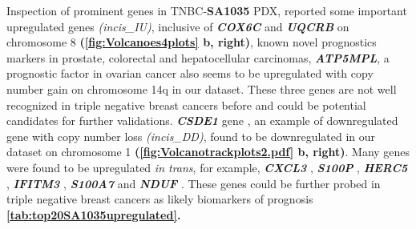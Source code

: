  Inspection of prominent genes in TNBC-\textbf{SA1035} PDX, reported some important upregulated genes \textit{(incis\_IU)}, inclusive of \textit{\textbf{COX6C}} \cite{yang2018overexpression,chang2017estrogen} and 
 \textit{\textbf{UQCRB}} \cite{kim2017mitochondrial,park2017mitochondrial} on chromosome 8 \textbf{(\autoref{fig:Volcanoes4plots} b, right)}, known novel prognostics markers in prostate, colorectal and hepatocellular carcinomas, \textit{\textbf{ATP5MPL}}, a prognostic factor in ovarian cancer also seems to be upregulated with copy number gain on chromosome 14q in our dataset. These three genes are not well recognized in triple negative breast cancers before and could be potential candidates for further validations. \textit{\textbf{CSDE1} } gene \cite{martinez2019unr}, an example of downregulated gene with copy number loss \textit{(incis\_DD)}, found to be downregulated in our dataset on chromosome 1 \textbf{(\autoref{fig:Volcanotrackplots2.pdf} b, right)}. Many genes were found to be upregulated \textit{in trans}, for example, \textit{\textbf{CXCL3} }\cite{gui2016overexpression, karin2020cxcr3}, \textit{\textbf{S100P}} \cite{arumugam2011s100p,cong2020calcium}, 
\textit{\textbf{HERC5}} \cite{wrage2015identification}, 
\textit{\textbf{IFITM3}} \cite{liu2019ifitm3}, \textit{\textbf{S100A7}} 
\cite{zhang2019clinical, mayama2018olfm} and \textit{\textbf{NDUF}} 
\cite{li2015down}. These genes could be further probed in triple negative breast cancers as likely biomarkers of prognosis \textbf{\autoref{tab:top20SA1035upregulated}.}

